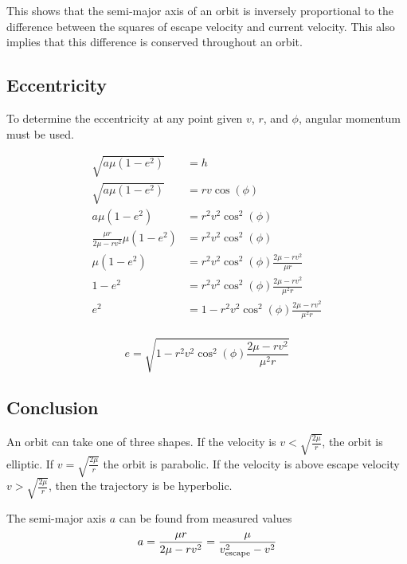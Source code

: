 \documentclass[../basicOrbitalDynamics.tex]{subfiles}
\begin{document}
This shows that the semi-major axis of an orbit is inversely proportional to the difference between the squares of escape velocity and current velocity. This also implies that this difference is conserved throughout an orbit.

\bigskip\bigskip
\subsection{Eccentricity}\label{sec:Eccentricity in Terms of V,R}

To determine the eccentricity at any point given $v$, $r$, and $\phi$, angular momentum must be used.

\begin{align*}
    \sqrt{a\mu(1-e^2)}                & =h                                            \\
    \sqrt{a\mu(1-e^2)}                & =rv\cos(\phi)                                 \\
    a\mu(1-e^2)                       & =r^2v^2\cos^2(\phi)                           \\
    \frac{\mu r}{2\mu-rv^2}\mu(1-e^2) & =r^2v^2\cos^2(\phi)                           \\
    \mu(1-e^2)                        & =r^2v^2\cos^2(\phi)\frac{2\mu-rv^2}{\mu r}    \\
    1-e^2                             & =r^2v^2\cos^2(\phi)\frac{2\mu-rv^2}{\mu^2r}   \\
    e^2                               & =1-r^2v^2\cos^2(\phi)\frac{2\mu-rv^2}{\mu^2r} \\
\end{align*}

\begin{equation}
    e=\sqrt{1-r^2v^2\cos^2(\phi)\frac{2\mu-rv^2}{\mu^2r}}
\end{equation}

\bigskip\bigskip
\subsection{Conclusion}

\bigskip
An orbit can take one of three shapes. If the velocity is $v<\sqrt{\frac{2\mu}{r}}$, the orbit is elliptic. If $v=\sqrt{\frac{2\mu}{r}}$ the orbit is parabolic. If the velocity is above escape velocity $v>\sqrt{\frac{2\mu}{r}}$, then the trajectory is be hyperbolic.

\bigskip
The semi-major axis $a$ can be found from measured values
\[a=\frac{\mu r}{2\mu-rv^2}=\frac{\mu}{{v}_\text{escape}^2-v^2}\]
\end{document}
